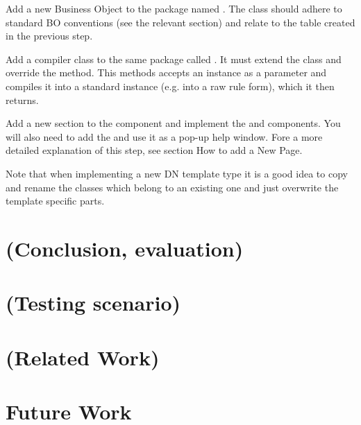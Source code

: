 Add a new Business Object to the  package named . The class should adhere to standard BO conventions (see the relevant section) and relate to the table created in the previous step.

Add a compiler class to the same package called . It must extend the  class and override the  method. This methods accepts an  instance as a parameter and compiles it into a standard  instance (e.g. into a raw rule form), which it then returns.

Add a new section to the  component and implement the  and  components. You will also need to add the  and use it as a pop-up help window. Fore a more detailed explanation of this step, see section How to add a New Page.

Note that when implementing a new DN template type it is a good idea to copy and rename the classes which belong to an existing one and just overwrite the template specific parts.


\chapter{(Conclusion, evaluation)}

\chapter{(Testing scenario)}

\chapter{(Related Work)}

\chapter{Future Work}

